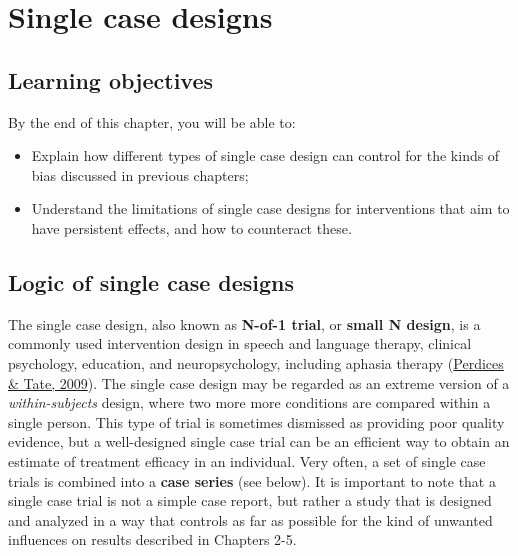 \documentclass{krantz}
\begin{document}
\hypertarget{Single}{%
\chapter{Single case designs}\label{Single}}

\hypertarget{learning-objectives-18}{%
\section{Learning objectives}\label{learning-objectives-18}}

By the end of this chapter, you will be able to:

\begin{itemize}
\item
  Explain how different types of single case design can control for the kinds of bias discussed in previous chapters;
\item
  Understand the limitations of single case designs for interventions that aim to have persistent effects, and how to counteract these.
\end{itemize}

\hypertarget{logic-of-single-case-designs}{%
\section{Logic of single case designs}\label{logic-of-single-case-designs}}

The single case design, also known as \textbf{N-of-1 trial}, or \textbf{small N design}, is a commonly used intervention design in speech and language therapy, clinical psychology, education, and neuropsychology, including aphasia therapy (\protect\hyperlink{ref-perdices2009}{Perdices \& Tate, 2009}). The single case design may be regarded as an extreme version of a \emph{within-subjects} design, where two more more conditions are compared within a single person. This type of trial is sometimes dismissed as providing poor quality evidence, but a well-designed single case trial can be an efficient way to obtain an estimate of treatment efficacy in an individual. Very often, a set of single case trials is combined into a \textbf{case series} (see below). It is important to note that a single case trial is not a simple case report, but rather a study that is designed and analyzed in a way that controls as far as possible for the kind of unwanted influences on results described in Chapters 2-5.
\end{document}

